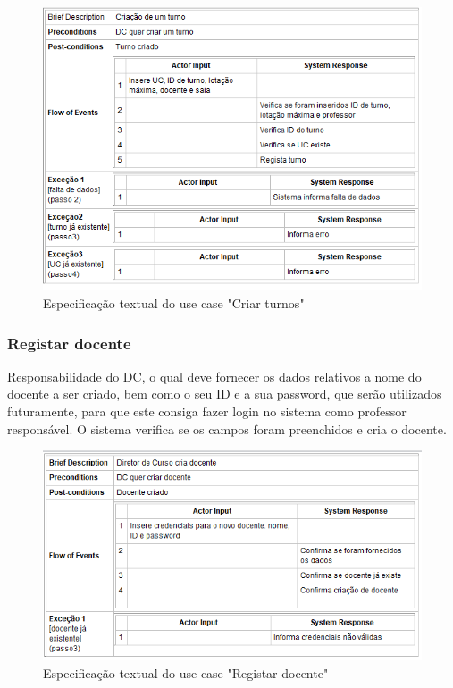\documentclass[a4paper]{article}
\begin{document}
\begin{figure}[H]
\centering
\includegraphics[width=14cm]{UCCriarTurnosADMIN}
\caption{Especificação textual do use case "Criar turnos"}
\label{}
\end{figure}

\clearpage
\subsubsection{Registar docente}
\hspace{3mm}Responsabilidade do DC, o qual deve fornecer os dados relativos a nome do docente a ser criado, bem como o seu ID e a sua password, que serão utilizados futuramente, para que este consiga fazer login no sistema como professor responsável. O sistema verifica se os campos foram preenchidos e cria o docente.

\begin{figure}[H]
\centering
\includegraphics[width=14cm]{UCRegistarDocenteADMIN}
\caption{Especificação textual do use case "Registar docente"}
\label{}
\end{figure}
\end{document}
